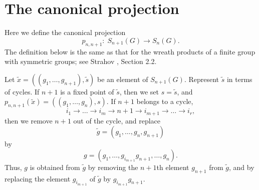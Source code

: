 \documentclass[12pt]{amsart}
\theoremstyle{definition}
\numberwithin{equation}{section}
\begin{document}
\section{The canonical projection}\label{SECTIONCANONICALPROJECTION}
Here we define the canonical projection
$$
p_{n,n+1}:\; S_{n+1}\left(G\right)\longrightarrow S_n\left(G\right).
$$
The definition below is the same as that for the wreath products of a finite group with symmetric groups; see Strahov \cite{StrahovIsr25}, Section 2.2.

Let $\tilde{x}=\left(\left(g_1,\ldots,g_{n+1}\right),\tilde{s}\right)$ be an element of $S_{n+1}(G)$.
Represent $\tilde{s}$ in terms of cycles. If $n+1$ is a fixed point of $\tilde{s}$, then we set
$s=\tilde{s}$, and $p_{n,n+1}\left(\tilde{x}\right)=\left(\left(g_1,\ldots,g_{n}\right), s\right)$.
If $n+1$ belongs to a cycle,
\begin{equation}\label{3.1}
i_1\rightarrow\ldots\rightarrow i_m\rightarrow n+1\rightarrow i_{m+1}\rightarrow\ldots\rightarrow i_r,
\end{equation}
then we remove $n+1$ out of the cycle, and replace
\begin{equation}\label{3.2}
\tilde{g}=\left(g_1,\ldots,g_n,g_{n+1}\right)
\end{equation}
by
\begin{equation}\label{3.3}
g=\left(g_1,\ldots, g_{i_{m+1}}g_{n+1},\ldots,g_n\right).
\end{equation}
Thus, $g$ is obtained from $\tilde{g}$ by removing the $n+1$th element $g_{n+1}$ from $\tilde{g}$, and by
replacing the element $g_{i_{m+1}}$ of $\tilde{g}$ by $g_{i_{m+1}}g_{n+1}$.
\end{document}
